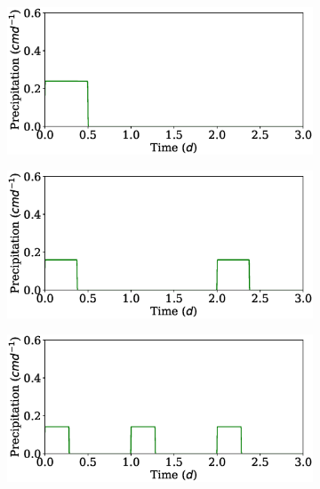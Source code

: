 \documentclass[11pt,a4paper]{article}
\numberwithin{equation}{section}
\begin{document}
  
\begin{figure}
	\centering
	\begin{subfigure}{0.32\textwidth}
		\includegraphics[width = \linewidth, keepaspectratio] {pr_ppat1ptot0_12.eps}
		\caption{}
	\end{subfigure}
	\begin{subfigure}{0.32\textwidth}
		\includegraphics[width = \linewidth, keepaspectratio] {pr_ppat2ptot0_12.eps}
		\caption{}
	\end{subfigure}
	\begin{subfigure}{0.32\textwidth}
		\includegraphics[width = \linewidth, keepaspectratio] {pr_ppat3ptot0_12.eps}
		\caption{}
	\end{subfigure}\\

\end{figure}
\end{document}
